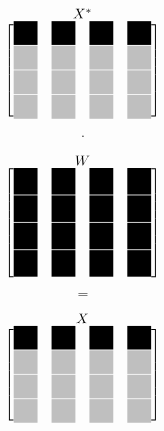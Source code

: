 \begin{center}
 
\begin{minipage}{0.2\textwidth}
 \begingroup
 \renewcommand*{\arraystretch}{1.1} %
 \renewcommand*{\arraycolsep}{0.0pt} %

 \[
  \stackrel{\mbox{$X^*$}}{
   \begin{bmatrix}
    \myBlackBox 	& \myBlackBox 		& \myBlackBox 		& \myBlackBox \\
    \myLightgrayBox 	& \myLightgrayBox 	& \myLightgrayBox 	& \myLightgrayBox \\
    \myLightgrayBox 	& \myLightgrayBox	& \myLightgrayBox	& \myLightgrayBox \\
    \myLightgrayBox 	& \myLightgrayBox 	& \myLightgrayBox 	& \myLightgrayBox 
   \end{bmatrix}
  }
 \]
 \endgroup
\end{minipage}
\begin{minipage}{0.05\textwidth}
 \[
  \cdot
 \]
\end{minipage}
\begin{minipage}{0.2\textwidth}
 \begingroup
 \renewcommand*{\arraystretch}{0.0} %
 \renewcommand*{\arraycolsep}{0.8pt} %

 \[
  \stackrel{\mbox{$W$}}{
   \begin{bmatrix}
    \myBlackBoxHigh 	& \myBlackBoxHigh 	& \myBlackBoxHigh 	& \myBlackBoxHigh \\
    \myBlackBoxHigh 	& \myBlackBoxHigh 	& \myBlackBoxHigh 	& \myBlackBoxHigh \\
    \myBlackBoxHigh 	& \myBlackBoxHigh 	& \myBlackBoxHigh 	& \myBlackBoxHigh \\
    \myBlackBoxHigh 	& \myBlackBoxHigh 	& \myBlackBoxHigh 	& \myBlackBoxHigh 
   \end{bmatrix}
  }
 \]
 \endgroup
\end{minipage}
\begin{minipage}{0.05\textwidth}
 \[
  =
 \]
\end{minipage}
\begin{minipage}{0.3\textwidth}
\begingroup
\renewcommand*{\arraystretch}{1.1} %
\renewcommand*{\arraycolsep}{0.8pt} %
\begin{align}\label{eq:matrix_F2}
  \stackrel{\mbox{$X$}}{
   \begin{bmatrix}
    \myBlackBox 	& \myBlackBox 		& \myBlackBox 		& \myBlackBox \\
    \myLightgrayBox 	& \myLightgrayBox 	& \myLightgrayBox 	& \myLightgrayBox \\
    \myLightgrayBox 	& \myLightgrayBox 	& \myLightgrayBox 	& \myLightgrayBox \\
    \myLightgrayBox 	& \myLightgrayBox 	& \myLightgrayBox 	& \myLightgrayBox 
   \end{bmatrix}
  }
 \end{align}
 \endgroup
\end{minipage}
\end{center}






